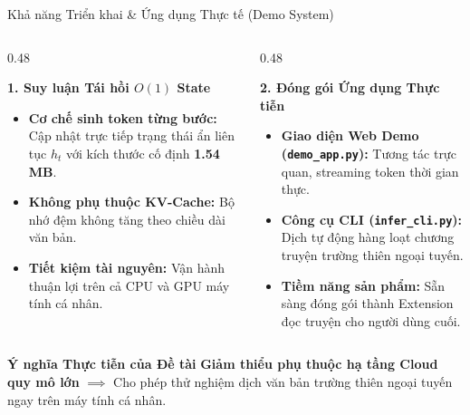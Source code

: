 \documentclass[aspectratio=169, 10pt]{beamer}
\begin{document}
\begin{frame}{Khả năng Triển khai \& Ứng dụng Thực tế (Demo System)}
  \begin{columns}[t]
    \begin{column}{0.48\textwidth}
      \begin{block}{\textbf{1. Suy luận Tái hồi $O(1)$ State}}
        \footnotesize
        \begin{itemize}
          \item \textbf{Cơ chế sinh token từng bước:} Cập nhật trực tiếp trạng thái ẩn liên tục $h_t$ với kích thước cố định \textbf{1.54 MB}.
          \item \textbf{Không phụ thuộc KV-Cache:} Bộ nhớ đệm không tăng theo chiều dài văn bản.
          \item \textbf{Tiết kiệm tài nguyên:} Vận hành thuận lợi trên cả CPU và GPU máy tính cá nhân.
        \end{itemize}
      \end{block}
    \end{column}
    \begin{column}{0.48\textwidth}
      \begin{block}{\textbf{2. Đóng gói Ứng dụng Thực tiễn}}
        \footnotesize
        \begin{itemize}
          \item \textbf{Giao diện Web Demo (\texttt{demo\_app.py}):} Tương tác trực quan, streaming token thời gian thực.
          \item \textbf{Công cụ CLI (\texttt{infer\_cli.py}):} Dịch tự động hàng loạt chương truyện trường thiên ngoại tuyến.
          \item \textbf{Tiềm năng sản phẩm:} Sẵn sàng đóng gói thành Extension đọc truyện cho người dùng cuối.
        \end{itemize}
      \end{block}
    \end{column}
  \end{columns}
  \vspace{0.15cm}
  \begin{exampleblock}{\textbf{Ý nghĩa Thực tiễn của Đề tài}}
    \centering\footnotesize
    \textbf{Giảm thiểu phụ thuộc hạ tầng Cloud quy mô lớn} $\implies$ Cho phép thử nghiệm dịch văn bản trường thiên ngoại tuyến ngay trên máy tính cá nhân.
  \end{exampleblock}
\end{frame}
\end{document}
